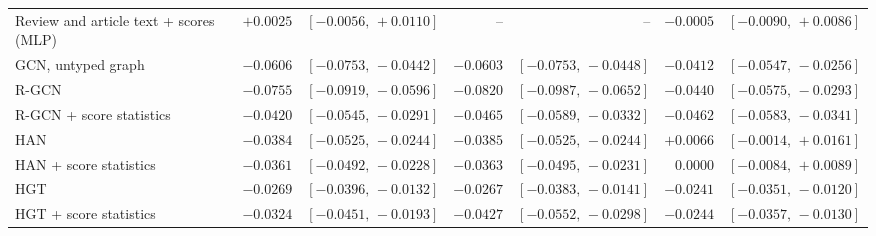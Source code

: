 \begin{table}[t]
\begin{tabular}{@{}lrrrrrr@{}}
Review and article text + scores (MLP) & $+0.0025$ & $[-0.0056,\,+0.0110]$ & -- & -- & $-0.0005$ & $[-0.0090,\,+0.0086]$ \\
GCN, untyped graph & $-0.0606$ & $[-0.0753,\,-0.0442]$ & $-0.0603$ & $[-0.0753,\,-0.0448]$ & $-0.0412$ & $[-0.0547,\,-0.0256]$ \\
R-GCN & $-0.0755$ & $[-0.0919,\,-0.0596]$ & $-0.0820$ & $[-0.0987,\,-0.0652]$ & $-0.0440$ & $[-0.0575,\,-0.0293]$ \\
R-GCN + score statistics & $-0.0420$ & $[-0.0545,\,-0.0291]$ & $-0.0465$ & $[-0.0589,\,-0.0332]$ & $-0.0462$ & $[-0.0583,\,-0.0341]$ \\
HAN & $-0.0384$ & $[-0.0525,\,-0.0244]$ & $-0.0385$ & $[-0.0525,\,-0.0244]$ & $+0.0066$ & $[-0.0014,\,+0.0161]$ \\
HAN + score statistics & $-0.0361$ & $[-0.0492,\,-0.0228]$ & $-0.0363$ & $[-0.0495,\,-0.0231]$ & $0.0000$ & $[-0.0084,\,+0.0089]$ \\
HGT & $-0.0269$ & $[-0.0396,\,-0.0132]$ & $-0.0267$ & $[-0.0383,\,-0.0141]$ & $-0.0241$ & $[-0.0351,\,-0.0120]$ \\
HGT + score statistics & $-0.0324$ & $[-0.0451,\,-0.0193]$ & $-0.0427$ & $[-0.0552,\,-0.0298]$ & $-0.0244$ & $[-0.0357,\,-0.0130]$ \\
\bottomrule
\end{tabular}
\end{table}

